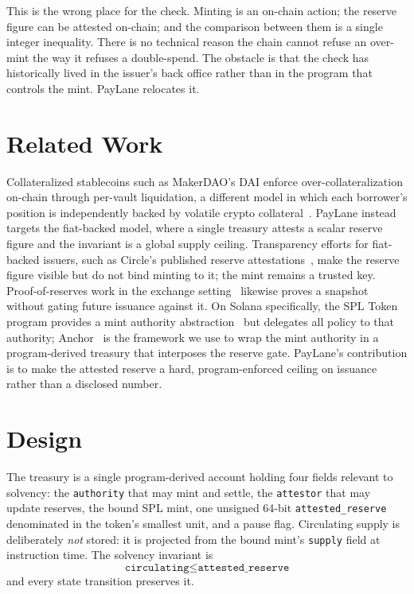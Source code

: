\documentclass[10pt,twocolumn]{article}
\begin{document}
This is the wrong place for the check. Minting is an on-chain action; the reserve
figure can be attested on-chain; and the comparison between them is a single
integer inequality. There is no technical reason the chain cannot refuse an
over-mint the way it refuses a double-spend. The obstacle is that the check has
historically lived in the issuer's back office rather than in the program that
controls the mint. PayLane relocates it.

\section{Related Work}
Collateralized stablecoins such as MakerDAO's DAI enforce over-collateralization
on-chain through per-vault liquidation, a different model in which each borrower's
position is independently backed by volatile crypto collateral~\cite{makerdao}.
PayLane instead targets the fiat-backed model, where a single treasury attests a
scalar reserve figure and the invariant is a global supply ceiling. Transparency
efforts for fiat-backed issuers, such as Circle's published reserve
attestations~\cite{circle-transparency}, make the reserve figure visible but do
not bind minting to it; the mint remains a trusted key. Proof-of-reserves work in
the exchange setting~\cite{proofofreserves} likewise proves a snapshot without
gating future issuance against it. On Solana specifically, the SPL Token program
provides a mint authority abstraction~\cite{spl-token} but delegates all policy to
that authority; Anchor~\cite{anchor} is the framework we use to wrap the mint
authority in a program-derived treasury that interposes the reserve gate. PayLane's
contribution is to make the attested reserve a hard, program-enforced ceiling on
issuance rather than a disclosed number.

\section{Design}
The treasury is a single program-derived account holding four fields relevant to
solvency: the \texttt{authority} that may mint and settle, the \texttt{attestor}
that may update reserves, the bound SPL mint, one unsigned 64-bit
\texttt{attested\_reserve} denominated in the token's smallest unit, and a pause
flag. Circulating supply is deliberately \emph{not} stored: it is projected from
the bound mint's \texttt{supply} field at instruction time. The solvency invariant
is
\[
\texttt{circulating} \le \texttt{attested\_reserve}
\]
and every state transition preserves it.
\end{document}
